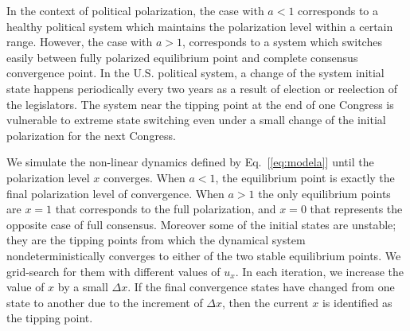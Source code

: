 In the context of political polarization, the case with $a<1$ corresponds to a healthy political system which maintains the polarization level within a certain range. However, the case with $a>1$, corresponds to a system which switches easily between fully polarized equilibrium point and complete consensus convergence point. In the U.S. political system, a change of the system initial state happens periodically every two years as a result of election or reelection of the legislators. The system near the tipping point at the end of one Congress is vulnerable to extreme state switching even under a small change of the initial 
polarization for the next Congress.

We simulate the non-linear dynamics defined by Eq.~[\ref{eq:modela}] until the polarization level $x$ converges. When $a<1$, the equilibrium point is exactly the final polarization level of convergence. 
When $a>1$ the only equilibrium points are $x=1$ that corresponds to the full polarization, and $x=0$ that represents the opposite case of full consensus. Moreover some of the initial states are unstable; they are the tipping points from which the dynamical system nondeterministically converges to either of the two stable equilibrium points.
We grid-search for them with different values of $u_x$. In each iteration, we increase the value of $x$ by a small $\Delta x$. If the final convergence states have changed from one state to another due to the increment of $\Delta x$, then the current $x$ is identified as the tipping point. 

